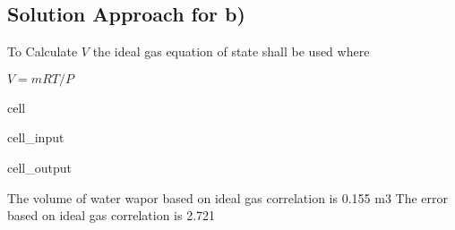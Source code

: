 \documentclass[letterpaper,10pt,english]{jupyterBook}
\begin{document}
\subsection{Solution Approach for b)}
\label{\detokenize{notebooks/Chapter3/CH3-Q6_v1:solution-approach-for-b}}
\sphinxAtStartPar
To Calculate \(V\) the ideal gas equation of state shall be used where

\sphinxAtStartPar
\(V=mRT/P\)

\begin{sphinxuseclass}{cell}\begin{sphinxVerbatimInput}

\begin{sphinxuseclass}{cell_input}
\begin{sphinxVerbatim}[commandchars=\\\{\}]
   
     
        

    
\end{sphinxVerbatim}

\end{sphinxuseclass}\end{sphinxVerbatimInput}
\begin{sphinxVerbatimOutput}

\begin{sphinxuseclass}{cell_output}
\begin{sphinxVerbatim}[commandchars=\\\{\}]
The volume of water wapor based on ideal gas correlation is 0.155 m3
The error based on ideal gas correlation is 2.721 \PYGZpc{}
\end{sphinxVerbatim}

\end{sphinxuseclass}\end{sphinxVerbatimOutput}

\end{sphinxuseclass}
\end{document}
